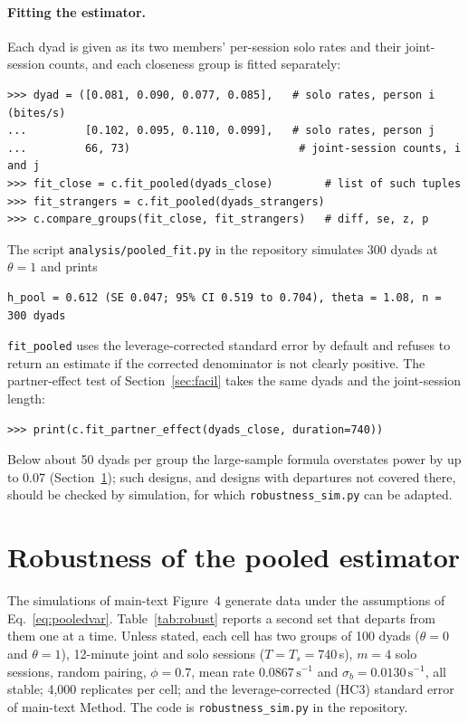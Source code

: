 \documentclass[12pt]{article}
\theoremstyle{definition}
\begin{document}
\paragraph{Fitting the estimator.} Each dyad is given as its two members'
per-session solo rates and their joint-session counts, and each closeness group is
fitted separately:
\begin{verbatim}
>>> dyad = ([0.081, 0.090, 0.077, 0.085],   # solo rates, person i (bites/s)
...         [0.102, 0.095, 0.110, 0.099],   # solo rates, person j
...         66, 73)                          # joint-session counts, i and j
>>> fit_close = c.fit_pooled(dyads_close)        # list of such tuples
>>> fit_strangers = c.fit_pooled(dyads_strangers)
>>> c.compare_groups(fit_close, fit_strangers)   # diff, se, z, p
\end{verbatim}
The script \texttt{analysis/pooled\_fit.py} in the repository simulates 300 dyads
at $\theta=1$ and prints
\begin{verbatim}
h_pool = 0.612 (SE 0.047; 95% CI 0.519 to 0.704), theta = 1.08, n = 300 dyads
\end{verbatim}
\texttt{fit\_pooled} uses the leverage-corrected standard error by default and
refuses to return an estimate if the corrected denominator is not clearly positive.
The partner-effect test of Section~\ref{sec:facil} takes the same dyads and the
joint-session length:
\begin{verbatim}
>>> print(c.fit_partner_effect(dyads_close, duration=740))
\end{verbatim}

Below about 50 dyads per group the large-sample formula overstates power by up to
0.07 (Section~\ref{sec:robust}); such designs, and designs with departures not
covered there, should be checked by simulation, for which
\texttt{robustness\_sim.py} can be adapted.

\section{Robustness of the pooled estimator}\label{sec:robust}

The simulations of main-text Figure~4 generate data under the assumptions of
Eq.~\eqref{eq:pooledvar}. Table~\ref{tab:robust} reports a second set that departs
from them one at a time. Unless stated, each cell has two groups of 100 dyads
($\theta=0$ and $\theta=1$), 12-minute joint and solo sessions ($T=T_s=740$\,s), $m=4$
solo sessions, random pairing, $\phi=0.7$, mean rate $0.0867\,\mathrm{s}^{-1}$ and
$\sigma_b=0.0130\,\mathrm{s}^{-1}$, all stable; 4{,}000 replicates per cell; and the
leverage-corrected (HC3) standard error of main-text Method. The code is
\texttt{robustness\_sim.py} in the repository.
\end{document}
